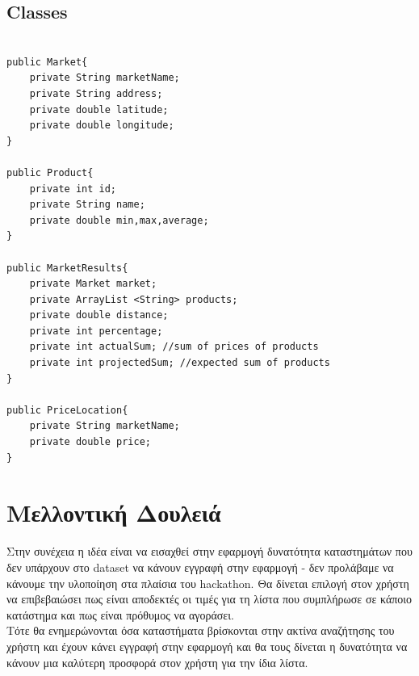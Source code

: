 \documentclass[a4paper,10pt]{report}
\begin{document}
\subsection{Classes}

\begin{verbatim}

public Market{
    private String marketName;
    private String address;
    private double latitude;
    private double longitude;
}

public Product{
    private int id;
    private String name;
    private double min,max,average;
}

public MarketResults{
    private Market market;
    private ArrayList <String> products;
    private double distance;
    private int percentage;
    private int actualSum; //sum of prices of products
    private int projectedSum; //expected sum of products
}

public PriceLocation{
    private String marketName;
    private double price;
}

\end{verbatim}

\section{Μελλοντική Δουλειά}

Στην συνέχεια η ιδέα είναι να εισαχθεί στην εφαρμογή δυνατότητα καταστημάτων 
που δεν υπάρχουν στο dataset να κάνουν εγγραφή στην εφαρμογή - δεν προλάβαμε να 
κάνουμε την υλοποίηση στα πλαίσια του hackathon. Θα δίνεται επιλογή στον χρήστη να 
επιβεβαιώσει πως είναι αποδεκτές οι τιμές για τη λίστα που συμπλήρωσε σε κάποιο 
κατάστημα και πως είναι πρόθυμος να αγοράσει. \\
Τότε θα ενημερώνονται όσα καταστήματα βρίσκονται στην ακτίνα αναζήτησης του χρήστη
και έχουν κάνει εγγραφή στην εφαρμογή και θα τους δίνεται η δυνατότητα να κάνουν
μια καλύτερη προσφορά στον χρήστη για την ίδια λίστα.\\
 
\end{document}
